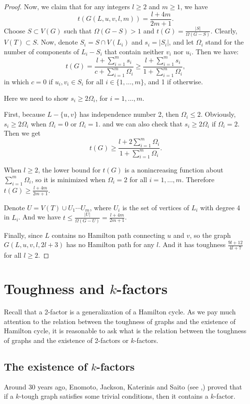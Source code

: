 \documentclass[12pt]{report}
\begin{document}
\begin{proof}
Now, we claim that for any integers $l\ge2$ and $m\ge1$, we have
$$t(G(L,u,v,l,m))=\frac{l+4m}{2m+1}.$$
Choose $S\subset V(G)$ such that $\Omega(G-S)>1$ and $t(G)=\frac{|S|}{\Omega(G-S)}$. Clearly, $V(T)\subset S$. Now, denote $S_i=S\cap V(L_i)$ and $s_i=|S_i|$, and let $\Omega_i$ stand for the number of components of $L_i-S_i$ that contain neither $v_i$ nor $u_i$. Then we have:
$$t(G)=\frac{l+\sum^m_{i=1}s_i}{c+\sum^m_{i=1}\Omega_i}\ge\frac{l+\sum^m_{i=1}s_i}{1+\sum^m_{i=1}\Omega_i},$$
in which $c=0$ if $u_i,v_i\in S_i$ for all $i\in\{1,\ldots,m\}$, and 1 if otherwise.

Here we need to show $s_i\ge2\Omega_i$, for $i=1,\ldots,m$.

First, because $L-\{u,v\}$ has independence number 2, then $\Omega_i\le2$. Obviously, $s_i\ge2\Omega_i$ when $\Omega_i=0$ or $\Omega_i=1$. and we can also check that $s_i\ge2\Omega_i$ if $\Omega_i=2$. Then we get $$t(G)\ge\frac{l+2\sum^m_{i=1}\Omega_i}{1+\sum^m_{i=1}\Omega_i}.$$

When $l\ge2$, the lower bound for $t(G)$ is a nonincreasing function about $\sum^m_{i=1}\Omega_i$, so it is minimized when $\Omega_i=2$ for all $i=1,\ldots,m$. Therefore $t(G)\ge\frac{l+4m}{2m+1}$.

Denote $U=V(T)\cup U_1\cdots U_m$, where $U_i$ is the set of vertices of $L_i$ with degree 4 in $L_i$. And we have $t\le\frac{|U|}{\Omega(G-U)}=\frac{l+4m}{2m+1}$.

Finally, since $L$ contains no Hamilton path connecting $u$ and $v$, so the graph $G(L,u,v,l,2l+3)$ has no Hamilton path for any $l$. And it has toughness $\frac{9l+12}{4l+7}$ for all $l\ge2$.


\end{proof}





\section{Toughness and $k$-factors}

Recall that a 2-factor is a generalization of a Hamilton cycle. As we pay much attention to the relation between the toughness of graphs and the existence of Hamilton cycle, it is reasonable to ask what is the relation between the toughness of graphs and the existence of 2-factors or $k$-factors.


\subsection{The existence of $k$-factors}
Around 30 years ago, Enomoto, Jackson, Katerinis and Saito (see \cite{enomoto1985toughness},\cite{enomoto1986toughness}) proved that if a $k$-tough graph satisfies some trivial conditions, then it contains a $k$-factor.
\end{document}
